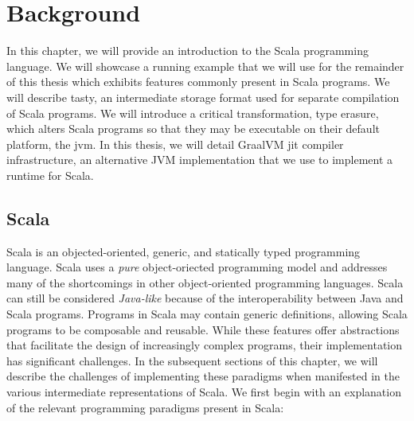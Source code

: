 \chapter{Background}

In this chapter, we will provide an introduction to the Scala programming language. 
We will showcase a running example that we will use for the remainder of this thesis which exhibits features commonly present in Scala programs. 
We will describe \acrfull{tasty}, an intermediate storage format used for separate compilation\cite{???} of Scala programs. 
We will introduce a critical transformation, type erasure, which alters Scala programs so that they may be executable on their default platform, the \acrfull{jvm}. 
In this thesis, we will detail GraalVM \acrfull{jit} compiler infrastructure, an alternative JVM implementation that we use to implement a runtime for Scala.

\section{Scala}

Scala\cite{scala:overview} is an objected-oriented, generic, and statically typed programming language.
Scala uses a \textit{pure} object-oriected programming model\cite{smalltalk:design} and addresses many of the shortcomings\cite{go4:design-patterns} in other object-oriented programming languages.
Scala can still be considered \textit{Java-like} because of the interoperability between Java and Scala programs.
Programs in Scala may contain generic definitions, allowing Scala programs to be composable and reusable\cite{scala:origins}.
While these features offer abstractions that facilitate the design of increasingly complex programs, their implementation has significant challenges.
In the subsequent sections of this chapter, we will describe the challenges of implementing these paradigms when manifested in the various intermediate representations of Scala.
We first begin with an explanation of the relevant programming paradigms present in Scala:

